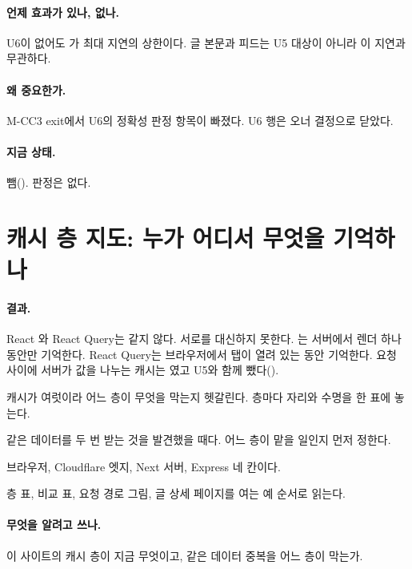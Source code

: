 \paragraph{언제 효과가 있나, 없나.}
U6이 없어도 가 최대 지연의 상한이다. 글 본문과 피드는 U5 대상이 아니라 이 지연과 무관하다.

\paragraph{왜 중요한가.}
M-CC3 exit에서 U6의 정확성 판정 항목이 빠졌다. U6 행은 오너 결정으로 닫았다.

\paragraph{지금 상태.}
뺌(). 판정은 없다.

\section{캐시 층 지도: 누가 어디서 무엇을 기억하나}\label{sec:cc3-map}

\paragraph{결과.}
React 와 React Query는 같지 않다. 서로를 대신하지 못한다.
는 서버에서 렌더 하나 동안만 기억한다. React Query는 브라우저에서 탭이 열려 있는 동안 기억한다.
요청 사이에 서버가 값을 나누는 캐시는 였고 U5와 함께 뺐다().

\begin{inbrief}
  \item[Why] 캐시가 여럿이라 어느 층이 무엇을 막는지 헷갈린다. 층마다 자리와 수명을 한 표에 놓는다.
  \item[When] 같은 데이터를 두 번 받는 것을 발견했을 때다. 어느 층이 맡을 일인지 먼저 정한다.
  \item[Where] 브라우저, Cloudflare 엣지, Next 서버, Express 네 칸이다.
  \item[How] 층 표, 비교 표, 요청 경로 그림, 글 상세 페이지를 여는 예 순서로 읽는다.
\end{inbrief}

\paragraph{무엇을 알려고 쓰나.}
이 사이트의 캐시 층이 지금 무엇이고, 같은 데이터 중복을 어느 층이 막는가.

